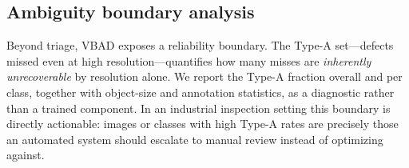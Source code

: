 \subsection{Ambiguity boundary analysis}
\label{sec:ambiguity}
Beyond triage, VBAD exposes a reliability boundary. The Type-A set---defects
missed even at high resolution---quantifies how many misses are
\emph{inherently unrecoverable} by resolution alone. We report the Type-A
fraction overall and per class, together with object-size and annotation
statistics, as a diagnostic rather than a trained component. In an industrial
inspection setting this boundary is directly actionable: images or classes with
high Type-A rates are precisely those an automated system should escalate to
manual review instead of optimizing against.

